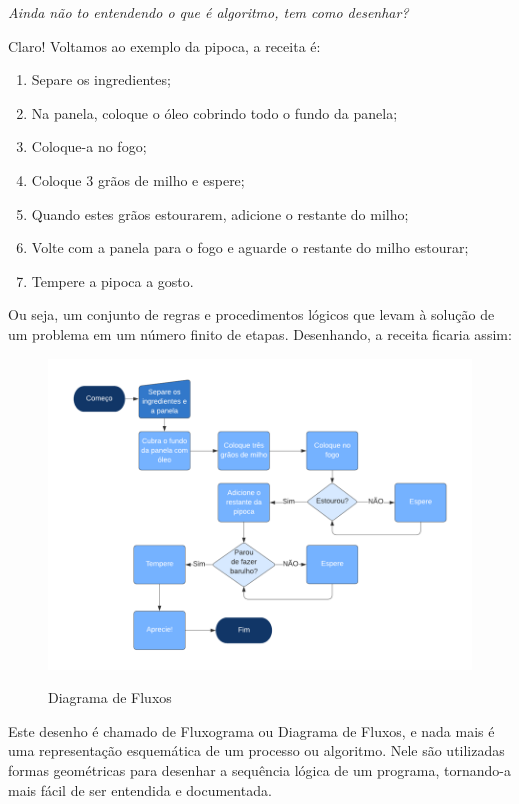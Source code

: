     \textit{Ainda não to entendendo o que é algoritmo, tem como desenhar?} \par
    Claro! Voltamos ao exemplo da pipoca, a receita é:\par
    
  \begin{enumerate}   
    \item	Separe os ingredientes;
    \item	Na panela, coloque o óleo cobrindo todo o fundo da panela;
    \item	Coloque-a no fogo;
    \item	Coloque 3 grãos de milho e espere;
    \item	Quando estes grãos estourarem, adicione o restante do milho;
    \item	Volte com a panela para o fogo e aguarde o restante do milho estourar;
    \item	Tempere a pipoca a gosto.
    \end{enumerate} 
    
    Ou seja, um conjunto de regras e procedimentos lógicos que levam à solução de um problema em um número finito de etapas. Desenhando, a receita ficaria assim:\par
   
    \begin{figure}[h]
    \caption{Diagrama de Fluxos}
    \centering 
    \includegraphics[width=14cm]{Figuras/Pipoca.png}
    \label{figura:Pipoca.jpeg}
    \end{figure}

    Este desenho é chamado de Fluxograma ou Diagrama de Fluxos, e nada mais é uma representação esquemática de um processo ou algoritmo. Nele são utilizadas formas geométricas para desenhar a sequência lógica de um programa, tornando-a mais fácil de ser entendida e documentada.\par
    
